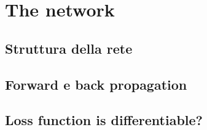 \chapter{The network} %
\label{cha:the_network}
	\section{Struttura della rete} %
	\label{sec:struttura_della_rete}
	

	\section{Forward e back propagation} %
	\label{sec:forward_e_back_propagation}
	

	\section{Loss function is differentiable?} %
	\label{sec:loss_function_is_differentiable_}
	
